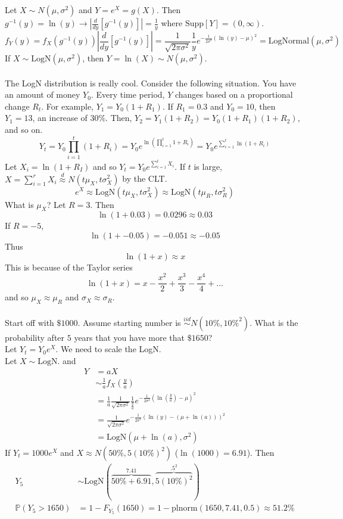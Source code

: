 \documentclass[12pt]{article}
\newcommand{\prob}[1]{\mathbb{P}(#1)}
\newcommand{\iid}{\stackrel{iid}{\sim}}
\newcommand{\supp}[1]{\text{Supp}[ #1 ]}
\newcommand{\ginvy}{g^{-1}(y)}
\begin{document}
Let $X \sim N(\mu, \sigma^2)$ and $Y = e^X = g(X)$. Then $\ginvy = \ln(y) \to | \frac{d}{dy} [\ginvy]| = \frac{1}{y}$ where $\supp{Y} = (0, \infty)$. 
$$f_Y(y) = f_X(\ginvy) |\frac{d}{dy} [\ginvy]| = \frac{1}{\sqrt{2\pi \sigma^2}} \frac{1}{y} e^{-\frac{1}{2 \sigma^2} (\ln(y) - \mu)^2} = \text{LogNormal}(\mu, \sigma^2) $$ 
If $X \sim \text{LogN}(\mu, \sigma^2)$, then $Y = \ln(X) \sim N(\mu, \sigma^2)$. \\~\\
The LogN distribution is really cool. Consider the following situation. You have an amount of money $Y_0$. Every time period, $Y$ changes based on a proportional change $R_t$. For example, $Y_1 = Y_0(1 + R_1)$. If $R_1 = 0.3$ and $Y_0 = 10$, then $Y_1 = 13$, an increase of $30\%$. Then, $Y_2 = Y_1(1 + R_2) = Y_0(1 + R_1)(1 + R_2)$, and so on. 
$$Y_t = Y_0 \prod_{i = 1}^t (1 + R_i) = Y_0 e^{\ln (\prod_{i = 1}^t 1 + R_i)} = Y_0 e^{\sum_{i = 1}^t \ln(1 + R_i)}$$ Let $X_i = \ln(1 + R_I)$ and so $Y_t = Y_0 e^{\sum_{i = 1}^t X_i}$. If $t$ is large, $X = \sum_{i = 1}^r X_i \stackrel{d}{\approx} N(t\mu_X, t\sigma^2_X)$ by the CLT. 
$$ e^X \approx \text{LogN}(t\mu_X, t\sigma^2_X) \approx \text{LogN}(t\mu_{R}, t\sigma_R^2) $$ 
What is $\mu_X$? Let $R = 3$. Then $$\ln(1 + 0.03) = 0.0296 \approx 0.03 $$ If $R = -5$, $$\ln(1 + -0.05) = -0.051 \approx -0.05 $$ Thus $$\ln(1 + x) \approx x$$ This is because of the Taylor series $$\ln(1 + x) = x - \frac{x^2}{2} + \frac{x^3}{3} - \frac{x^4}{4} + \dots $$ and so $\mu_X \approx \mu_R$ and $\sigma_X \approx \sigma_R$. \\~\\
Start off with $\$1000$. Assume starting number is $\iid N(10\%,10\%^2)$. What is the probability after $5$ years that you have more that $\$1650$? \\ Let $Y_t = Y_0e^X$. We need to scale the LogN. \\ Let $X \sim \text{LogN}$. and $$ \begin{aligned} Y &= aX \\ &\sim \frac{1}{a} f_X(\frac{y}{a}) \\ &= \frac{1}{a} \frac{1}{\sqrt{2\pi \sigma^2}} \frac{1}{\frac{y}{a}} e^{-\frac{1}{2\sigma^2} (\ln(\frac{y}{a}) - \mu)^2} \\ &= \frac{1}{\sqrt{2\pi \sigma^2}} e^{-\frac{1}{2\sigma^2} (\ln(y) - (\mu + \ln(a)))^2} \\ &= \text{LogN}(\mu + \ln(a), \sigma^2) \end{aligned} $$ 
If $Y_t = 1000e^X$ and $X \approx N(50\%, 5(10\%)^2)$ ($\ln(1000) = 6.91$). Then 
$$ \begin{aligned} Y_5 &\sim \text{LogN}(\overbrace{50\% + 6.91}^{7.41}, \overbrace{5(10\%)^2}^{.5^2}) \\ \prob{Y_5 > 1650} &= 1 - F_{Y_5}(1650) = 1 - \text{plnorm}(1650, 7.41, 0.5) \approx 51.2 \% \end{aligned} $$ 
\end{document}
